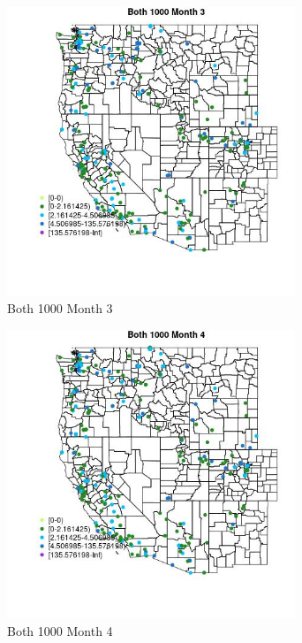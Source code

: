 \begin{figure} 
\centering  
\includegraphics[width=0.77\textwidth]{Code_Outputs/Report_ML_input_PM25_Step4_part_e_de_duplicated_aveswNAs_MapObsMo3Both_1000.jpg} 
\caption{\label{fig:Report_ML_input_PM25_Step4_part_e_de_duplicated_aveswNAsMapObsMo3Both_1000}Both 1000 Month 3} 
\end{figure} 
 

\begin{figure} 
\centering  
\includegraphics[width=0.77\textwidth]{Code_Outputs/Report_ML_input_PM25_Step4_part_e_de_duplicated_aveswNAs_MapObsMo4Both_1000.jpg} 
\caption{\label{fig:Report_ML_input_PM25_Step4_part_e_de_duplicated_aveswNAsMapObsMo4Both_1000}Both 1000 Month 4} 
\end{figure} 
 

